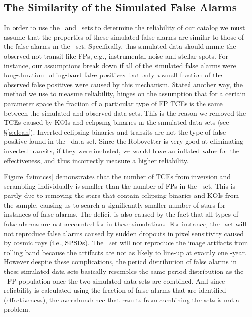 \subsection{The Similarity of the Simulated False Alarms}
\label{s:simularity}
In order to use the \scrtce\ and \invtce\ sets to determine the reliability of our catalog we must assume that the properties of these simulated false alarms are similar to those of the false alarms in the \opstce\ set.  Specifically, this simulated data should mimic the observed not transit-like FPs, e.g., instrumental noise and stellar spots. For instance, our assumptions break down if all of the simulated false alarms were long-duration rolling-band false positives, but only a small fraction of the observed false positives were caused by this mechanism.  Stated another way, the method we use to measure reliability, hinges on the assumption that for a certain parameter space the fraction of a particular type of FP TCEs is the same between the simulated and observed data sets.  This is the reason we removed the TCEs caused by KOIs and eclipsing binaries in the simulated data sets (see \S\ref{s:clean}). Inverted eclipsing binaries and transits are not the type of false positive found in the \opstce\ data set.  Since the Robovetter is very good at eliminating inverted transits, if they were included, we would have an inflated value for the effectiveness, and thus incorrectly measure a higher reliability. 

Figure\,\ref{f:simtces} demonstrates that the number of TCEs from inversion and scrambling individually is smaller than the number of FPs in the \opstce\ set. This is partly due to removing the stars that contain eclipsing binaries and KOIs from the sample, causing us to search a significantly smaller number of stars for instances of false alarms. The deficit is also caused by the fact that all types of false alarms are not accounted for in these simulations. For instance, the \invtce\ set will not reproduce false alarms caused by sudden dropouts in pixel sensitivity caused by cosmic rays (i.e., SPSDs). The \scrtce\ set will not reproduce the image artifacts from rolling band because the artifacts are not as likely to line-up at exactly one \Kepler -year.  However despite these complications, the period distribution of false alarms in these simulated data sets basically resembles the same period distribution as the \opstce\ FP population once the two simulated data sets are combined. And since reliability is calculated using the fraction of false alarms that are identified (effectiveness), the overabundance that results from combining the sets is not a problem.


